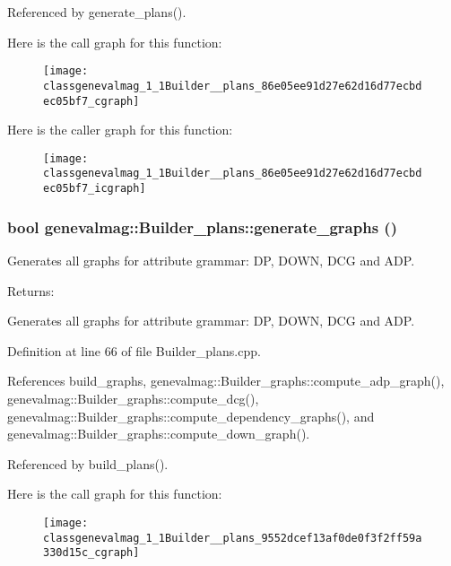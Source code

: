 Referenced by generate\_\-plans().

Here is the call graph for this function:\nopagebreak
\begin{figure}[H]
\begin{center}
\leavevmode
\texttt{[image: classgenevalmag\_1\_1Builder\_\_plans\_86e05ee91d27e62d16d77ecbdec05bf7\_cgraph]}
\end{center}
\end{figure}


Here is the caller graph for this function:\nopagebreak
\begin{figure}[H]
\begin{center}
\leavevmode
\texttt{[image: classgenevalmag\_1\_1Builder\_\_plans\_86e05ee91d27e62d16d77ecbdec05bf7\_icgraph]}
\end{center}
\end{figure}
\hypertarget{classgenevalmag_1_1Builder__plans_9552dcef13af0de0f3f2ff59a330d15c}{
\subsubsection[{generate\_\-graphs}]{\setlength{\rightskip}{0pt plus 5cm}bool genevalmag::Builder\_\-plans::generate\_\-graphs ()}}
\label{classgenevalmag_1_1Builder__plans_9552dcef13af0de0f3f2ff59a330d15c}


Generates all graphs for attribute grammar: DP, DOWN, DCG and ADP. \begin{Desc}
\item[Returns:]\end{Desc}
Generates all graphs for attribute grammar: DP, DOWN, DCG and ADP. 

Definition at line 66 of file Builder\_\-plans.cpp.

References build\_\-graphs, genevalmag::Builder\_\-graphs::compute\_\-adp\_\-graph(), genevalmag::Builder\_\-graphs::compute\_\-dcg(), genevalmag::Builder\_\-graphs::compute\_\-dependency\_\-graphs(), and genevalmag::Builder\_\-graphs::compute\_\-down\_\-graph().

Referenced by build\_\-plans().

Here is the call graph for this function:\nopagebreak
\begin{figure}[H]
\begin{center}
\leavevmode
\texttt{[image: classgenevalmag\_1\_1Builder\_\_plans\_9552dcef13af0de0f3f2ff59a330d15c\_cgraph]}
\end{center}
\end{figure}


